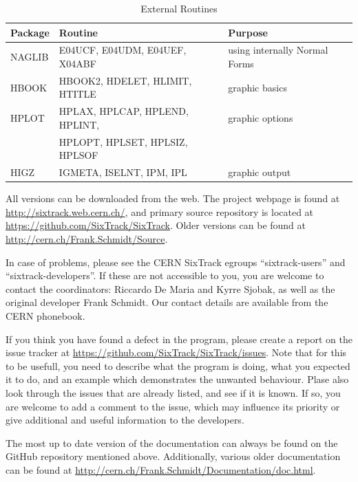 \documentclass[a4paper,11pt]{report}
\begin{document}
\begin{table}[h]
\caption{External Routines}
\label{T-ExtRou}
\scriptsize \centering
\begin{tabular}{|l|l|l|}
  \hline \rule[-3.75mm]{0mm}{10mm}
  {\bf\large Package} & {\bf\large Routine} & {\bf\large Purpose} \\
  \hline \rule[-3.75mm]{0mm}{10mm} NAGLIB & E04UCF, E04UDM, E04UEF,
  X04ABF & using internally Normal
  Forms \\
  \hline \rule[-3.75mm]{0mm}{10mm}
  HBOOK & HBOOK2, HDELET, HLIMIT, HTITLE & graphic basics \\
  \hline \rule[-3.75mm]{0mm}{10mm}
  HPLOT & HPLAX, HPLCAP, HPLEND, HPLINT, & graphic options \\
  \cline{2-2} \rule[-3.75mm]{0mm}{10mm}
  & HPLOPT, HPLSET, HPLSIZ, HPLSOF &  \\
  \hline \rule[-3.75mm]{0mm}{10mm}
  HIGZ & IGMETA, ISELNT, IPM, IPL & graphic output \\
  \hline
\end{tabular}
\normalsize
\end{table}


All versions can be downloaded from the web.
The project webpage is found at \url{http://sixtrack.web.cern.ch/},
and primary source repository is located at \url{https://github.com/SixTrack/SixTrack}.
Older versions can be found at \url{http://cern.ch/Frank.Schmidt/Source}.

In case of problems, please see the CERN SixTrack egroups ``sixtrack-users'' and ``sixtrack-developers''.
If these are not accessible to you, you are welcome to contact the coordinators: Riccardo De Maria and Kyrre Sjobak, as well as the original developer Frank Schmidt.
Our contact details are available from the CERN phonebook.

If you think you have found a defect in the program, please create a report on the issue tracker at \url{https://github.com/SixTrack/SixTrack/issues}.
Note that for this to be usefull, you need to describe what the program is doing, what you expected it to do, and an example which demonstrates the unwanted behaviour.
Plase also look through the issues that are already listed, and see if it is known.
If so, you are welcome to add a comment to the issue, which may influence its priority or give additional and useful information to the developers.

The most up to date version of the documentation can always be found on the GitHub repository mentioned above.
Additionally, various older documentation can be found at \url{http://cern.ch/Frank.Schmidt/Documentation/doc.html}.
\end{document}
